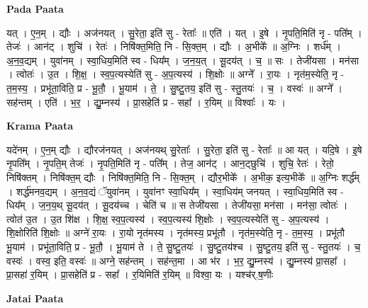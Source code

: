 \documentclass[17pt]{extarticle}
\begin{document}
\textbf{Pada Paata} \newline

यत् । ए॒न॒म् । द्यौः । अज॑नयत् । सु॒रेता॒ इति॑ सु - रेताः᳚ ॥ एति॑ । यत् । इ॒षे । नृ॒पति॒मिति॑ नृ - पति᳚म् । तेजः॑ । आन॑ट् । शुचि॑ । रेतः॑ । निषि॑क्त॒मिति॒ नि - सि॒क्त॒म् । द्यौः । अ॒भीके᳚ ॥ अ॒ग्निः । शर्ध᳚म् । अ॒न॒व॒द्यम् । युवा॑नम् । स्वा॒धिय॒मिति॑ स्व - धिय᳚म् । ज॒न॒य॒त् । सू॒दय॑त् । च॒ ॥ सः । तेजी॑यसा । मन॑सा । त्वोतः॑ । उ॒त । शि॒क्ष॒ । स्व॒प॒त्यस्येति॑ सु - अ॒प॒त्यस्य॑ । शि॒क्षोः ॥ अग्ने᳚ । रा॒यः । नृत॑म॒स्येति॒ नृ - त॒म॒स्य॒ । प्रभू॑ता॒विति॒ प्र - भू॒तौ॒ । भू॒याम॑ । ते॒ । सु॒ष्टु॒तय॒ इति॑ सु - स्तु॒तयः॑ । च॒ । वस्वः॑ ॥ अग्ने᳚ । सह॑न्तम् । एति॑ । भ॒र॒ । द्यु॒म्नस्य॑ । प्रा॒सहेति॑ प्र - सहा᳚ । र॒यिम् ॥ विश्वाः᳚ । यः ।  \newline


\textbf{Krama Paata} \newline

यदे॑नम् । ए॒न॒म् द्यौः । द्यौरज॑नयत् । अज॑नयथ् सु॒रेताः᳚ । सु॒रेता॒ इति॑ सु - रेताः᳚ ॥ आ यत् । यदि॒षे । इ॒षे नृ॒पति᳚म् । नृ॒पति॒म् तेजः॑ । नृ॒पति॒मिति॑ नृ - पति᳚म् । तेज॒ आन॑ट् । आन॒ट्छुचि॑ । शुचि॒ रेतः॑ । रेतो॒ निषि॑क्तम् । निषि॑क्त॒म् द्यौः । निषि॑क्त॒मिति॒ नि - सि॒क्त॒म् । द्यौर॒भीके᳚ । अ॒भीक॒ इत्य॒भीके᳚ ॥ अ॒ग्निः शर्द्ध᳚म् । शर्द्ध॑मनव॒द्यम् । अ॒न॒व॒द्यं ॅयुवा॑नम् । युवा॑नꣳ स्वा॒धिय᳚म् । स्वा॒धिय॑म् जनयत् । स्वा॒धिय॒मिति॑ स्व - धिय᳚म् । ज॒न॒य॒थ् सू॒दय॑त् । सू॒दय॑च्च । चेति॑ च ॥ स तेजी॑यसा । तेजी॑यसा॒ मन॑सा । मन॑सा॒ त्वोतः॑ । त्वोत॑ उ॒त । उ॒त शि॑क्ष । शि॒क्ष॒ स्व॒प॒त्यस्य॑ । स्व॒प॒त्यस्य॑ शि॒क्षोः । स्व॒प॒त्यस्येति॑ सु - अ॒प॒त्यस्य॑ । शि॒क्षोरिति॑ शि॒क्षोः ॥ अग्ने॑ रा॒यः । रा॒यो नृत॑मस्य । नृत॑मस्य॒ प्रभू॑तौ । नृत॑म॒स्येति॒ नृ - त॒म॒स्य॒ । प्रभू॑तौ भू॒याम॑ । प्रभू॑ता॒विति॒ प्र - भू॒तौ॒ । भू॒याम॑ ते । ते॒ सु॒ष्टु॒तयः॑ । सु॒ष्टु॒तय॑श्च । सु॒ष्टु॒तय॒ इति॑ सु - स्तु॒तयः॑ । च॒ वस्वः॑ । वस्व॒ इति॒ वस्वः॑ ॥ अग्ने॒ सह॑न्तम् । सह॑न्त॒मा । आ भ॑र । भ॒र॒ द्यु॒म्नस्य॑ । द्यु॒म्नस्य॑ प्रा॒सहा᳚ । प्रा॒सहा॑ र॒यिम् । प्रा॒सहेति॑ प्र - सहा᳚ । र॒यिमिति॑ र॒यिम् ॥ विश्वा॒ यः । यश्च॑र्.ष॒णीः \newline

\textbf{Jatai Paata} \newline
\end{document}
